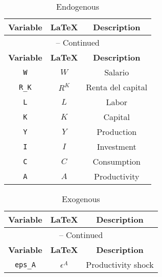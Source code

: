 \begin{center}
\begin{longtable}{ccc}
\caption{Endogenous}\\%
\hline%
\multicolumn{1}{c}{\textbf{Variable}} &
\multicolumn{1}{c}{\textbf{\LaTeX}} &
\multicolumn{1}{c}{\textbf{Description}}\\%
\hline\hline%
\endfirsthead
\multicolumn{3}{c}{{\tablename} \thetable{} -- Continued}\\%
\hline%
\multicolumn{1}{c}{\textbf{Variable}} &
\multicolumn{1}{c}{\textbf{\LaTeX}} &
\multicolumn{1}{c}{\textbf{Description}}\\%
\hline\hline%
\endhead
\texttt{W} & $W$ & Salario\\
\texttt{R\_K} & $R^{K}$ & Renta del capital\\
\texttt{L} & $L$ & Labor\\
\texttt{K} & $K$ & Capital\\
\texttt{Y} & $Y$ & Production\\
\texttt{I} & $I$ & Investment\\
\texttt{C} & $C$ & Consumption\\
\texttt{A} & $A$ & Productivity\\
\hline%
\end{longtable}
\end{center}
\begin{center}
\begin{longtable}{ccc}
\caption{Exogenous}\\%
\hline%
\multicolumn{1}{c}{\textbf{Variable}} &
\multicolumn{1}{c}{\textbf{\LaTeX}} &
\multicolumn{1}{c}{\textbf{Description}}\\%
\hline\hline%
\endfirsthead
\multicolumn{3}{c}{{\tablename} \thetable{} -- Continued}\\%
\hline%
\multicolumn{1}{c}{\textbf{Variable}} &
\multicolumn{1}{c}{\textbf{\LaTeX}} &
\multicolumn{1}{c}{\textbf{Description}}\\%
\hline\hline%
\endhead
\texttt{eps\_A} & $\epsilon^{A}$ & Productivity shock\\
\hline%
\end{longtable}
\end{center}
